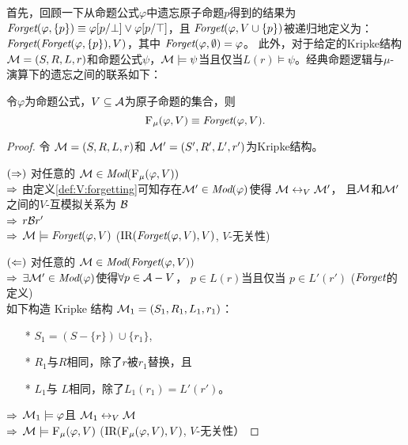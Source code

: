 首先，回顾一下从命题公式$\varphi$中遗忘原子命题$p$得到的结果为$\textit{Forget}(\varphi, \{p\})\equiv \varphi[p/\bot] \vee \varphi[p/\top]$，且 $\textit{Forget}(\varphi, V\cup \{p\})$被递归地定义为： $\textit{Forget}(\textit{Forget}(\varphi, \{p\}),V)$，其中 $\textit{Forget}(\varphi, \emptyset) = \varphi$。
此外，对于给定的Kripke结构${\cal M} = (S, R, L, r)$和命题公式$\psi$，${\cal M} \models  \psi$当且仅当$L(r) \models \psi$。经典命题逻辑与$\mu$-演算下的遗忘之间的联系如下：
\begin{theorem}\label{thm:PL:CTL}
	令$\varphi$为命题公式，$V\subseteq {\cal A}$为原子命题的集合，则
	\[
	{\textsc{F}_{\textsc{$\mu$}}}(\varphi, V) \equiv \textit{Forget}(\varphi, V).
	\]
\end{theorem}
\begin{proof}
	令 ${\cal M} = (S, R, L, r)$和 ${\cal M}' = (S', R', L', r')$为Kripke结构。
	
	$(\Rightarrow)$ 对任意的 ${\cal M} \in \textit{Mod}({\textsc{F}_{\textsc{$\mu$}}}(\varphi, V))$ \\
	$\Rightarrow$ 由定义\ref{def:V:forgetting}可知存在${\cal M}' \in \textit{Mod}(\varphi)$使得 ${\cal M} \leftrightarrow_V {\cal M}'$， %
	 且${\cal M}$和${\cal M}'$之间的$V$-互模拟关系为 ${\cal B}$\\
	$\Rightarrow$ $r {\cal B} r'$ \\
	$\Rightarrow$ ${\cal M} \models \textit{Forget}(\varphi, V)$ \hfill ($\textrm{IR}(\textit{Forget}(\varphi, V),V)$, $V$-无关性)
	
	$(\Leftarrow)$ 对任意的 ${\cal M} \in \textit{Mod}(\textit{Forget}(\varphi, V))$ \\
	$\Rightarrow$ $\exists {\cal M}' \in\textit{Mod}(\varphi)$使得$\forall p \in {\cal A}-V$， $p \in L(r)$当且仅当 $p \in L'(r')$ \hfill ($\textit{Forget}$的定义)\\
	
	如下构造 Kripke 结构 ${\cal M}_1 = (S_1, R_1, L_1, r_1)$：
	\begin{itemize}
		\item[*] $S_1 = (S - \{r\}) \cup \{r_1\}$,
		\item[*] $R_1$与$R$相同，除了$r$被$r_1$替换，且
		\item[*] $L_1$与 $L$相同，除了$L_1(r_1) = L'(r')$。
	\end{itemize}
	$\Rightarrow$ ${\cal M}_1 \models \varphi$且 ${\cal M}_1 \leftrightarrow_V {\cal M}$\\
	$\Rightarrow$ ${\cal M} \models {\textsc{F}_{\textsc{$\mu$}}}(\varphi, V)$ \hfill ($\textrm{IR}({\textsc{F}_{\textsc{$\mu$}}}(\varphi, V), V)$, $V$-无关性）
\end{proof}

